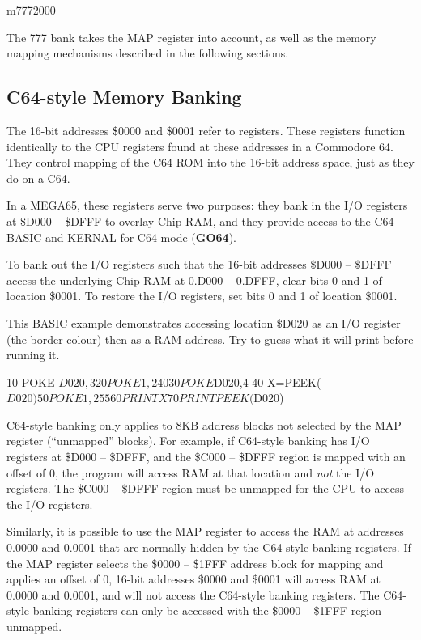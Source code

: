 \begin{basiccode}
m7772000
\end{basiccode}

The 777 bank takes the MAP register into account, as well as the memory
mapping mechanisms described in the following sections.

\subsection{C64-style Memory Banking}

The 16-bit addresses \$0000 and \$0001 refer to registers. These registers
function identically to the CPU registers found at these addresses in a
Commodore 64. They control mapping of the C64 ROM into the 16-bit address
space, just as they do on a C64.

In a MEGA65, these registers serve two purposes: they bank in the I/O registers
at \$D000 -- \$DFFF to overlay Chip RAM, and they provide access to the C64
BASIC and KERNAL for C64 mode (\textbf{GO64}).

To bank out the I/O registers such that the 16-bit addresses \$D000 -- \$DFFF
access the underlying Chip RAM at 0.D000 -- 0.DFFF, clear bits 0 and 1 of
location \$0001. To restore the I/O registers, set bits 0 and 1 of location
\$0001.

This BASIC example demonstrates accessing location \$D020 as an I/O register
(the border colour) then as a RAM address. Try to guess what it will print
before running it.

\begin{basiccode}
10 POKE $D020,3
20 POKE 1,240
30 POKE $D020,4
40 X=PEEK($D020)
50 POKE 1,255
60 PRINT X
70 PRINT PEEK($D020)
\end{basiccode}

C64-style banking only applies to 8KB address blocks not selected by the MAP
register (``unmapped'' blocks). For example, if C64-style banking has I/O
registers at \$D000 -- \$DFFF, and the \$C000 -- \$DFFF region is mapped with
an offset of 0, the program will access RAM at that location and {\em not} the
I/O registers. The \$C000 -- \$DFFF region must be unmapped for the CPU to
access the I/O registers.

Similarly, it is possible to use the MAP register to access the RAM at
addresses 0.0000 and 0.0001 that are normally hidden by the C64-style banking
registers. If the MAP register selects the \$0000 -- \$1FFF address block for
mapping and applies an offset of 0, 16-bit addresses \$0000 and \$0001 will
access RAM at 0.0000 and 0.0001, and will not access the C64-style banking
registers. The C64-style banking registers can only be accessed with
the \$0000 -- \$1FFF region unmapped.

